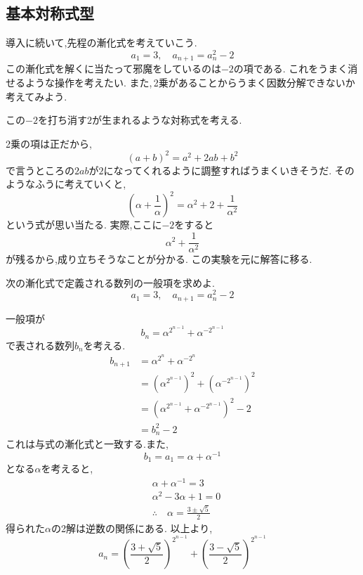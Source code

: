 \subsection{基本対称式型}\label{節：基本対称式型}
導入に続いて,先程の漸化式を考えていこう.
\[
  a_1=3, \quad a_{n+1}=a_n^2-2
\]
この漸化式を解くに当たって邪魔をしているのは$-2$の項である.
これをうまく消せるような操作を考えたい.
また,\,2乗があることからうまく因数分解できないか考えてみよう.

この$-2$を打ち消す$2$が生まれるような対称式を考える.

2乗の項は正だから,
\[
  (a+b)^2=a^2+2ab+b^2
\]
で言うところの$2ab$が$2$になってくれるように調整すればうまくいきそうだ.
そのようなふうに考えていくと,
\[
  \left(\alpha+\frac{1}{\alpha}\right)^2=\alpha^2+2+\frac{1}{\alpha^2}
\]
という式が思い当たる.
実際,ここに$-2$をすると
\[
  \alpha^2+\frac{1}{\alpha^2}
\]
が残るから,成り立ちそうなことが分かる.
この実験を元に解答に移る.

\noindent {}
\begin{smallquote}
  次の漸化式で定義される数列の一般項を求めよ.
  \[
    a_1=3, \quad a_{n+1}=a_n^2-2
  \]
\end{smallquote}
  \begin{smallquote}
  一般項が
    \[
      b_n=\alpha^{2^{n-1}}+\alpha^{-2^{n-1}}
    \]
    で表される数列$b_n$を考える.
    \begin{align*}
      b_{n+1}&=\alpha^{2^{n}}+\alpha^{-2^{n}}\\
      &=\left(\alpha^{2^{n-1}}\right)^2+\left(\alpha^{-2^{n-1}}\right)^2\\
      &=\left(\alpha^{2^{n-1}}+\alpha^{-2^{n-1}}\right)^2-2\\
      &=b_n^2-2
    \end{align*}
    これは与式の漸化式と一致する.また,
    \[
      b_1=a_1=\alpha+\alpha^{-1}
    \]
    となる$\alpha$を考えると,
    \begin{align*}
      &\alpha+\alpha^{-1}=3\\
      &\alpha^2-3\alpha+1=0\\
      &\therefore \quad \alpha=\frac{3\pm \sqrt{5}}{2}
    \end{align*}
    得られた$\alpha$の2解は逆数の関係にある.
    以上より,
    \[
      a_n=\left(\frac{3+ \sqrt{5}}{2}\right)^{2^{n-1}}+\left(\frac{3- \sqrt{5}}{2}\right)^{2^{n-1}}
    \]
  \end{smallquote}

